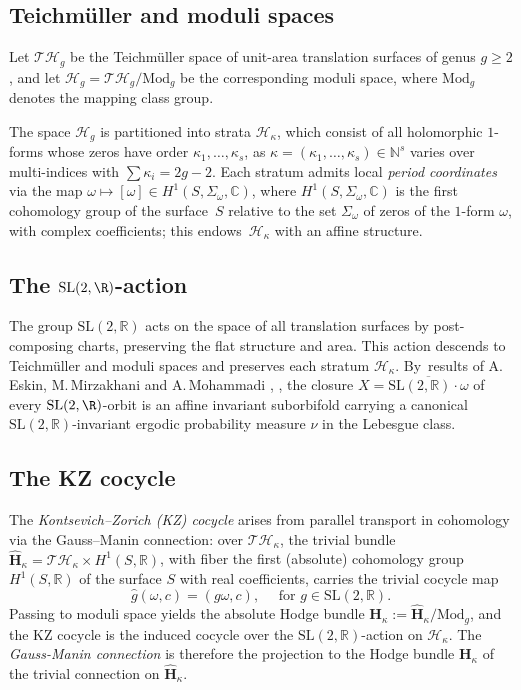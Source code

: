 \documentclass[10pt]{amsart}
\theoremstyle{plain}
\theoremstyle{definition}
\numberwithin{equation}{subsection}
\newcommand\cH{\mathcal{H}}
\newcommand\cT{\mathcal{T}}
\newcommand{\Mod}{\mathrm{Mod}}
\newcommand{\SL}{\mathrm{SL}}
\newcommand{\bfH}{\boldsymbol{H}}
\newcommand{\Tm}{Teichmüller\xspace}
\begin{document}
\subsection{Teichmüller and moduli spaces} Let $ \cT\cH_g$ be the \Tm space of unit-area translation surfaces of genus $g \geq 2$, and let $ \cH_g = \cT\cH_g / \Mod_g$ be the corresponding moduli space, where $\Mod_g$ denotes the mapping class group.

The space $\cH_g$ is partitioned into strata $\cH_{\kappa}$, which consist of all holomorphic $1$\nobreakdash-forms whose zeros have order $\kappa_1, \dots, \kappa_s$, as $\kappa=(\kappa_1, \dots, \kappa_s) \in \mathbb N^s$ varies over multi-indices with $\sum \kappa_i = 2g-2$. Each stratum admits local \emph{period coordinates} via the map $\omega \mapsto [\omega] \in H^1(S, \Sigma_\omega, \mathbb{C})$, where $H^1(S, \Sigma_\omega, \mathbb{C})$ is the first cohomology group of the surface~$S$ relative to the set $\Sigma_\omega$ of zeros of the $1$-form $\omega$, with complex coefficients; this endows~$\cH_\kappa$ with an affine structure.

\subsection{The $\SL(2,\R)$-action} The group $\SL(2,\mathbb{R})$ acts on the space of all translation surfaces by post-composing charts, preserving the flat structure and area. This action descends to Teichmüller and moduli spaces
and preserves each stratum $\cH_\kappa$. By~results of A.\,Eskin, M.\,Mirzakhani and A.\,Mohammadi \cite{EMM15}, \cite{EM18}, the closure $X = \overline{\SL(2,\mathbb{R}) \cdot \omega}$ of every $\SL(2, \R)$-orbit is an affine invariant suborbifold carrying a canonical $\SL(2,\mathbb{R})$-invariant ergodic probability measure $\nu$ in the Lebesgue class.

\subsection{The KZ cocycle} The \emph{Kontsevich–Zorich (KZ) cocycle} arises from parallel transport in cohomology via the Gauss–Manin connection: over $\cT\cH_\kappa$, the trivial \hbox{bundle} $\widehat{\bfH}_\kappa = \cT\cH_\kappa \times H^1(S, \mathbb{R})$, with fiber the first (absolute) cohomology group $H^1(S, \mathbb{R})$ of the surface $S$ with real coefficients, carries the trivial cocycle map
\[
\widehat{g}(\omega, c) = (g\omega, c), \quad \text{ for } g \in \SL(2,\mathbb{R}).
\]
Passing to moduli space yields the absolute Hodge bundle $\bfH_\kappa := \widehat{\bfH}_\kappa / \Mod_g$, and the KZ cocycle is the induced cocycle over the $\SL(2,\mathbb{R})$-action on $\cH_\kappa$. The \emph{Gauss-Manin connection} is therefore the projection to the Hodge bundle $\bfH_\kappa$ of the trivial connection on $\widehat{\bfH}_\kappa$.
\end{document}
